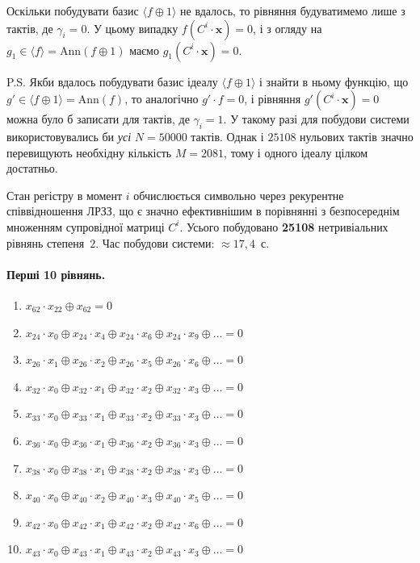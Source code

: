 Оскільки побудувати базис $\langle f \oplus 1 \rangle$ не вдалось, то рівняння будуватимемо лише з тактів, де 
$\gamma_i = 0$. У цьому випадку $f(C^i \cdot \mathbf{x}) = 0$, і з огляду на $g_1 \in \langle f \rangle = \mathrm{Ann}(f \oplus 1)$ маємо
$g_1(C^i \cdot \mathbf{x}) = 0$.

P.S. Якби вдалось побудувати базис ідеалу $\langle f \oplus 1 \rangle$ і знайти в ньому функцію, що 
$g' \in \langle f \oplus 1 \rangle = \mathrm{Ann}(f)$, то аналогічно $g' \cdot f = 0$, і рівняння 
$g'(C^i \cdot \mathbf{x}) = 0$ можна було б записати для тактів, де $\gamma_i = 1$. У такому разі для побудови 
системи використовувались би \emph{усі} $N = 50000$ тактів. Однак і $25108$ нульових тактів значно перевищують 
необхідну кількість $M = 2081$, тому і одного ідеалу цілком достатньо.

Стан регістру в момент $i$ обчислюється символьно через рекурентне співвідношення ЛРЗЗ, що є значно ефективнішим 
в порівнянні з безпосереднім множенням супровідної матриці $C^i$. Усього побудовано \textbf{25108} нетривіальних 
рівнянь степеня~$2$. Час побудови системи: $\approx 17{,}4$~с.

\paragraph{Перші 10 рівнянь.}
\begin{enumerate}
    \item $x_{62} \cdot x_{22} \oplus x_{62} = 0$
    \item $x_{24} \cdot x_{0} \oplus x_{24} \cdot x_{4} \oplus x_{24} \cdot x_{6} \oplus x_{24} \cdot x_{9} \oplus \ldots = 0$
    \item $x_{26} \cdot x_{1} \oplus x_{26} \cdot x_{2} \oplus x_{26} \cdot x_{5} \oplus x_{26} \cdot x_{6} \oplus \ldots = 0$
    \item $x_{32} \cdot x_{0} \oplus x_{32} \cdot x_{1} \oplus x_{32} \cdot x_{2} \oplus x_{32} \cdot x_{3} \oplus \ldots = 0$
    \item $x_{33} \cdot x_{0} \oplus x_{33} \cdot x_{1} \oplus x_{33} \cdot x_{2} \oplus x_{33} \cdot x_{3} \oplus \ldots = 0$
    \item $x_{36} \cdot x_{0} \oplus x_{36} \cdot x_{1} \oplus x_{36} \cdot x_{2} \oplus x_{36} \cdot x_{3} \oplus \ldots = 0$
    \item $x_{38} \cdot x_{0} \oplus x_{38} \cdot x_{1} \oplus x_{38} \cdot x_{2} \oplus x_{38} \cdot x_{3} \oplus \ldots = 0$
    \item $x_{40} \cdot x_{0} \oplus x_{40} \cdot x_{2} \oplus x_{40} \cdot x_{3} \oplus x_{40} \cdot x_{5} \oplus \ldots = 0$
    \item $x_{42} \cdot x_{0} \oplus x_{42} \cdot x_{1} \oplus x_{42} \cdot x_{2} \oplus x_{42} \cdot x_{6} \oplus \ldots = 0$
    \item $x_{43} \cdot x_{0} \oplus x_{43} \cdot x_{1} \oplus x_{43} \cdot x_{2} \oplus x_{43} \cdot x_{3} \oplus \ldots = 0$
\end{enumerate}

